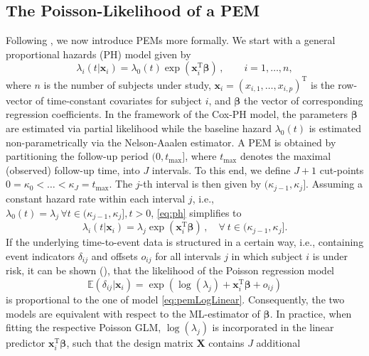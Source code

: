 \documentclass[submit]{smj}
\newcommand{\bfx}{\mathbf{x}}
\newcommand{\bfX}{\mathbf{X}}
\newcommand{\bsbeta}{\boldsymbol{\beta}}
\def\T{{ \mathrm{\scriptscriptstyle T} }}
\begin{document}
\subsection{The Poisson-Likelihood of a PEM}
\label{ssec:PEMpoisson}
Following \cite{BenEtAl:16}, we now introduce PEMs more formally.
We start with a general proportional hazards (PH) model given by
\begin{equation}\label{eq:ph}
\lambda_i(t|\bfx_i) = \lambda_0(t)\exp (\bfx_i^{\T}\bsbeta)\,,\quad\quad i=1,\ldots, n,
\end{equation}
where $n$ is the number of
subjects under study,  $\bfx_i=(x_{i,1}, \dots, x_{i,p})^{\T}$ is
the row-vector of time-constant covariates for subject $i$, and $\bsbeta$ the vector of corresponding regression coefficients.
In the framework of the Cox-PH model, the parameters
$\bsbeta$ are estimated via partial likelihood while the baseline hazard $\lambda_0(t)$ is
estimated non-parametrically via the Nelson-Aaalen estimator.
A PEM is obtained by partitioning the follow-up
period $(0, t_{\max}]$, where $t_{\max}$ denotes the maximal (observed) follow-up time, into $J$ intervals.
To this end, we define $J+1$
cut-points $0 = \kappa_0 < \ldots < \kappa_J = t_{\max}$.
The $j$-th interval is then given by $(\kappa_{j-1}, \kappa_j]$. Assuming a constant hazard rate within each interval $j$, i.e.,\ $\lambda_0(t) = \lambda_j \,\forall t\in (\kappa_{j-1}, \kappa_j], t > 0$, \eqref{eq:ph} simplifies to
\begin{equation}\label{eq:pemLogLinear}
\lambda_i(t|\bfx_i) =
  \lambda_j\exp(\bfx_i^{\T}\bsbeta)\,,\quad \forall\ t\in (\kappa_ {j-1}, \kappa_j].
\end{equation}
If the underlying time-to-event data is structured in a certain way, i.e., containing
event indicators $\delta_{ij}$ and offsets $o_{ij}$ for all intervals
$j$ in which subject $i$ is under risk,
it can be shown (\citealp{Friedman1982}), that the likelihood of the Poisson
regression model
\begin{equation}\label{eq:poissonLogLinear}
\mathbb{E}(\delta_{ij}|\bfx_i) =
 \exp(\log(\lambda_{j}) + \bfx_i^{\T}\bsbeta + o_ {ij})
\end{equation}
is proportional to the one of model \eqref{eq:pemLogLinear}.
Consequently, the two models are equivalent with respect to the ML-estimator of
$\bsbeta$. In practice, when fitting the respective
Poisson GLM, $\log(\lambda_{j})$ is incorporated in the linear predictor
$\bfx_i^{\T}\bsbeta$, such that the design matrix $\bfX$ contains $J$ additional
\end{document}
